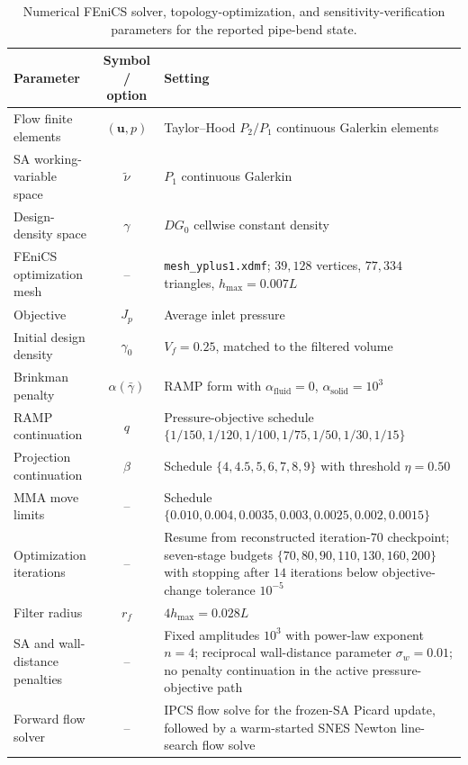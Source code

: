 \begin{table}[htbp]
	\centering
	\scriptsize
	\caption{Numerical FEniCS solver, topology-optimization, and sensitivity-verification parameters for the reported pipe-bend state.}
	\label{tab:app_B_alexandersen_pipebend_numerical}
	\renewcommand{\arraystretch}{1.2}
	\begin{tabularx}{\textwidth}{l c X}
		\hline
		\textbf{Parameter} & \textbf{Symbol / option} & \textbf{Setting} \\
		\hline
		Flow finite elements & $(\mathbf{u},p)$ & Taylor--Hood $P_2/P_1$ continuous Galerkin elements \\
		SA working-variable space & $\tilde{\nu}$ & $P_1$ continuous Galerkin \\
		Design-density space & $\gamma$ & $DG_0$ cellwise constant density \\
		FEniCS optimization mesh & -- & \texttt{mesh\_yplus1.xdmf}; $39{,}128$ vertices, $77{,}334$ triangles, $h_{\max}=0.007L$ \\
		Objective & $J_p$ & Average inlet pressure \\
		Initial design density & $\gamma_0$ & $V_f=0.25$, matched to the filtered volume \\
			Brinkman penalty & $\alpha(\bar{\gamma})$ & RAMP form with $\alpha_{\mathrm{fluid}}=0$, $\alpha_{\mathrm{solid}}=10^3$ \\
				RAMP continuation & $q$ & Pressure-objective schedule $\{1/150,1/120,1/100,1/75,1/50,1/30,1/15\}$ \\
				Projection continuation & $\beta$ & Schedule $\{4,4.5,5,6,7,8,9\}$ with threshold $\eta=0.50$ \\
				MMA move limits & -- & Schedule $\{0.010,0.004,0.0035,0.003,0.0025,0.002,0.0015\}$ \\
				Optimization iterations & -- & Resume from reconstructed iteration-$70$ checkpoint; seven-stage budgets $\{70,80,90,110,130,160,200\}$ with stopping after $14$ iterations below objective-change tolerance $10^{-5}$ \\
			Filter radius & $r_f$ & $4h_{\max}=0.028L$ \\
				SA and wall-distance penalties & -- & Fixed amplitudes $10^3$ with power-law exponent $n=4$; reciprocal wall-distance parameter $\sigma_w=0.01$; no penalty continuation in the active pressure-objective path \\
			Forward flow solver & -- & IPCS flow solve for the frozen-SA Picard update, followed by a warm-started SNES Newton line-search flow solve \\

\end{tabularx}
\end{table}
